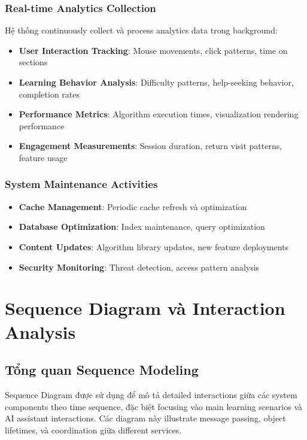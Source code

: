 \subsubsection{Real-time Analytics Collection}

Hệ thống continuously collect và process analytics data trong background:

\begin{itemize}
    \item \textbf{User Interaction Tracking}: Mouse movements, click patterns, time on sections
    \item \textbf{Learning Behavior Analysis}: Difficulty patterns, help-seeking behavior, completion rates
    \item \textbf{Performance Metrics}: Algorithm execution times, visualization rendering performance
    \item \textbf{Engagement Measurements}: Session duration, return visit patterns, feature usage
\end{itemize}

\subsubsection{System Maintenance Activities}

\begin{itemize}
    \item \textbf{Cache Management}: Periodic cache refresh và optimization
    \item \textbf{Database Optimization}: Index maintenance, query optimization
    \item \textbf{Content Updates}: Algorithm library updates, new feature deployments
    \item \textbf{Security Monitoring}: Threat detection, access pattern analysis
\end{itemize}

\section{Sequence Diagram và Interaction Analysis}
\label{sec:sequence-diagram}

\subsection{Tổng quan Sequence Modeling}
\label{subsec:sequence-overview}

Sequence Diagram được sử dụng để mô tả detailed interactions giữa các system components theo time sequence, đặc biệt focusing vào main learning scenarios và AI assistant interactions. Các diagram này illustrate message passing, object lifetimes, và coordination giữa different services.

